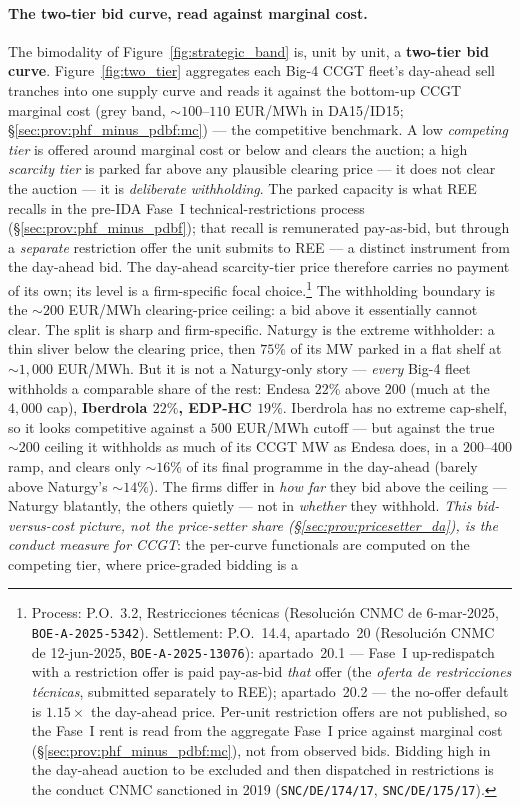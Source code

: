 \documentclass[11pt,a4paper]{article}
\begin{document}
\paragraph{The two-tier bid curve, read against marginal cost.} The bimodality of Figure~\ref{fig:strategic_band} is, unit by unit, a \textbf{two-tier bid curve}. Figure~\ref{fig:two_tier} aggregates each Big-4 CCGT fleet's day-ahead sell tranches into one supply curve and reads it against the bottom-up CCGT marginal cost (grey band, $\sim\!100$--$110$ EUR/MWh in DA15/ID15; \S\ref{sec:prov:phf_minus_pdbf:mc}) --- the competitive benchmark. A low \emph{competing tier} is offered around marginal cost or below and clears the auction; a high \emph{scarcity tier} is parked far above any plausible clearing price --- it does not clear the auction --- it is \emph{deliberate withholding}. The parked capacity is what REE recalls in the pre-IDA Fase~I technical-restrictions process (\S\ref{sec:prov:phf_minus_pdbf}); that recall is remunerated pay-as-bid, but through a \emph{separate} restriction offer the unit submits to REE --- a distinct instrument from the day-ahead bid. The day-ahead scarcity-tier price therefore carries no payment of its own; its level is a firm-specific focal choice.\footnote{Process: P.O.~3.2, Restricciones técnicas (Resolución CNMC de 6-mar-2025, \texttt{BOE-A-2025-5342}). Settlement: P.O.~14.4, apartado~20 (Resolución CNMC de 12-jun-2025, \texttt{BOE-A-2025-13076}): apartado~20.1 --- Fase~I up-redispatch with a restriction offer is paid pay-as-bid \emph{that} offer (the \emph{oferta de restricciones técnicas}, submitted separately to REE); apartado~20.2 --- the no-offer default is $1.15\times$ the day-ahead price. Per-unit restriction offers are not published, so the Fase~I rent is read from the aggregate Fase~I price against marginal cost (\S\ref{sec:prov:phf_minus_pdbf:mc}), not from observed bids. Bidding high in the day-ahead auction to be excluded and then dispatched in restrictions is the conduct CNMC sanctioned in 2019 (\texttt{SNC/DE/174/17}, \texttt{SNC/DE/175/17}).} The withholding boundary is the $\sim\!200$ EUR/MWh clearing-price ceiling: a bid above it essentially cannot clear. The split is sharp and firm-specific. Naturgy is the extreme withholder: a thin sliver below the clearing price, then $75\%$ of its MW parked in a flat shelf at $\sim\!1{,}000$ EUR/MWh. But it is not a Naturgy-only story --- \emph{every} Big-4 fleet withholds a comparable share of the rest: Endesa $22\%$ above $200$ (much at the $4{,}000$ cap), \textbf{Iberdrola $22\%$, EDP-HC $19\%$}. Iberdrola has no extreme cap-shelf, so it looks competitive against a $500$ EUR/MWh cutoff --- but against the true $\sim\!200$ ceiling it withholds as much of its CCGT MW as Endesa does, in a $200$--$400$ ramp, and clears only $\sim\!16\%$ of its final programme in the day-ahead (barely above Naturgy's $\sim\!14\%$). The firms differ in \emph{how far} they bid above the ceiling --- Naturgy blatantly, the others quietly --- not in \emph{whether} they withhold. \emph{This bid-versus-cost picture, not the price-setter share (\S\ref{sec:prov:pricesetter_da}), is the conduct measure for CCGT}: the per-curve functionals are computed on the competing tier, where price-graded bidding is a 
\end{document}
